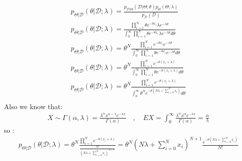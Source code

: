 \documentclass[12pt]{article}
\begin{document}
\begin{qsolve}
    \begin{gather*}
        p_{\Theta | \mathcal{D}}(\theta | \mathcal{D} ; \lambda) = \frac{p_{\mathcal{D} | \Theta}(\mathcal{D} | \Theta ; \theta) p_{\Theta}(\Theta ; \lambda)}{p_{\mathcal{D}}(\mathcal{D})}\\
        p_{\Theta | \mathcal{D}}(\theta | \mathcal{D} ; \lambda) = \frac{\prod_{i=1}^{N} \theta e^{-\theta x_i} \lambda e^{-\lambda \theta}}{\int_{0}^{\infty} \prod_{i=1}^{N} \theta e^{-\theta x_i} \lambda e^{-\lambda \theta} d\theta}\\
        p_{\Theta | \mathcal{D}}(\theta | \mathcal{D} ; \lambda) = \theta^{N} \frac{\prod_{i=1}^{N} e^{-\theta x_i} e^{-\lambda \theta}}{\int_{0}^{\infty} \prod_{i=1}^{N} \theta e^{-\theta x_i} e^{-\lambda \theta} d\theta}\\
        p_{\Theta | \mathcal{D}}(\theta | \mathcal{D} ; \lambda) = \theta^{N} \frac{\prod_{i=1}^{N} e^{-\theta (x_i + \lambda)}}{\int_{0}^{\infty} \prod_{i=1}^{N} \theta e^{-\theta (x_i + \lambda)} d\theta}\\
        p_{\Theta | \mathcal{D}}(\theta | \mathcal{D} ; \lambda) = \theta^{N} \frac{\prod_{i=1}^{N} e^{-\theta (x_i + \lambda)}}{\int_{0}^{\infty} \theta^{N} e^{-\theta (N \lambda + \sum_{i=0}^{N} x_i)} d\theta}\\
    \end{gather*}
    Also we know that:
    \begin{gather*}
        X \sim \Gamma(\alpha,\lambda) = \frac{\lambda^{\alpha} x^{\alpha-1} e^{-\lambda x}}{\Gamma(\alpha)} \quad , \quad  EX = \int_{0}^{\infty} \frac{\lambda^{\alpha} x^{\alpha} e^{-\lambda x}}{\Gamma(\alpha)} = \frac{\alpha}{\lambda}
    \end{gather*}
    so :
    \begin{gather*}
        p_{\Theta | \mathcal{D}}(\theta | \mathcal{D} ; \lambda) = \theta^{N} \frac{\prod_{i=1}^{N} e^{-\theta (x_i + \lambda)}}{\frac{N!}{(N \lambda + \sum_{i=0}^{N} x_i)^{N+1}}} =\theta^{N} (N \lambda + \sum_{i=0}^{N} x_i)^{N+1}\frac{e^{-\theta (N \lambda + \sum_{i=0}^{N} x_i)}}{N!} \\
    \end{gather*}
\end{qsolve}
\end{document}
